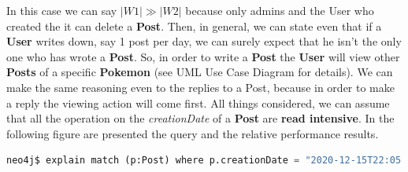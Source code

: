 In this case we can say $|W1| \gg |W2|$ because only admins and the User who created the it can delete a \textbf{Post}. Then, in general, we can state even that if a \textbf{User} writes down, say 1 post per day, we can surely expect that he isn't the only one who has wrote a \textbf{Post}. So, in order to write a \textbf{Post} the \textbf{User} will view other \textbf{Posts} of a specific \textbf{Pokemon} (see UML Use Case Diagram for details). We can make the same reasoning even to the replies to a Post, because in order to make a reply the viewing action will come first. All things considered, we can assume that all the operation on the \textit{creationDate} of a \textbf{Post} are \textbf{read intensive}. In the following figure are presented the query and the relative performance results.

\begin{lstlisting}[language=python]
	neo4j$ explain match (p:Post) where p.creationDate = "2020-12-15T22:05:32.382000000" return p
\end{lstlisting}

